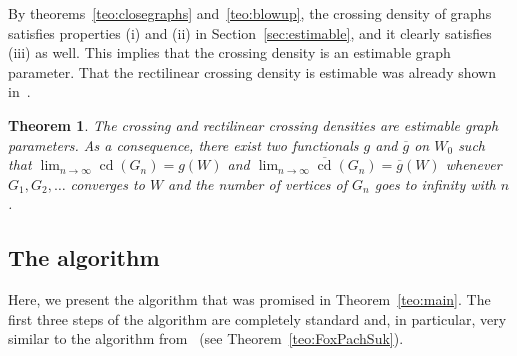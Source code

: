 \documentclass{article}
\newcounter{contSect} \numberwithin{contSect}{section}
\newtheorem{theorem}[contSect]{Theorem}
\begin{document}
By theorems~\ref{teo:closegraphs} and~\ref{teo:blowup}, the crossing density of graphs satisfies properties (i) and (ii) in Section~\ref{sec:estimable}, and it clearly satisfies (iii) as well. This implies that the crossing density is an estimable graph parameter. That the rectilinear crossing density is estimable was already shown in~\cite{approximatingrect}.

\begin{theorem}\label{teo:estimable}
    The crossing and rectilinear crossing densities are estimable graph parameters. As a consequence, there exist two functionals $g$ and $\overline{g}$ on $W_0$ such that $\lim_{n\rightarrow\infty}\mathop{\mathrm{cd}}(G_n)=g(W)$ and $\lim_{n\rightarrow\infty}\overline{\mathop{\mathrm{cd}}}(G_n)=\overline{g}(W)$ whenever $G_1,G_2,\dots$ converges to $W$ and the number of vertices of $G_n$ goes to infinity with $n$.
\end{theorem}



\subsection{The algorithm}

Here, we present the algorithm that was promised in Theorem~\ref{teo:main}. The first three steps of the algorithm are completely standard and, in particular, very similar to the algorithm from~\cite{approximatingrect} (see Theorem~\ref{teo:FoxPachSuk}).
\end{document}
